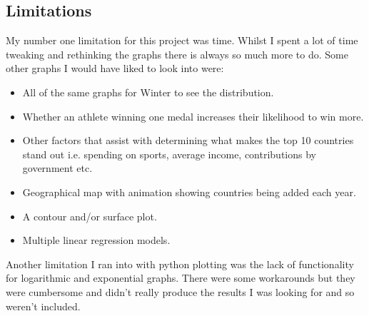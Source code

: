 \documentclass[a4 paper, 12pt]{article}
\begin{document}
        \subsection{Limitations}
        My number one limitation for this project was time. Whilst I spent a lot of time tweaking and rethinking the graphs there is always so much more to do. Some other graphs I would have liked to look into were:
            \begin{itemize}
                \item All of the same graphs for Winter to see the distribution.
                \item Whether an athlete winning one medal increases their likelihood to win more.
                \item Other factors that assist with determining what makes the top 10 countries stand out i.e. spending on sports, average income, contributions by government etc.
                \item Geographical map with animation showing countries being added each year.
                \item A contour and/or surface plot.
                \item Multiple linear regression models.
            \end{itemize}
        Another limitation I ran into with python plotting was the lack of functionality for logarithmic and exponential graphs. There were some workarounds but they were cumbersome and didn't really produce the results I was looking for and so weren't included. 
\end{document}
